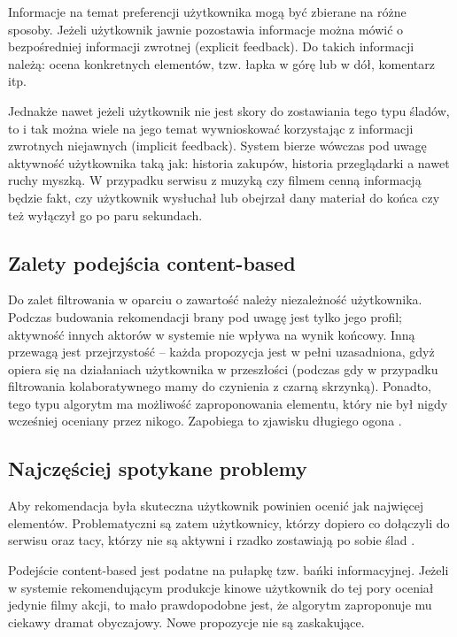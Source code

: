 \documentclass[twoside]{iisthesis}
\begin{document}
	 Informacje na temat preferencji użytkownika mogą być zbierane na różne sposoby. Jeżeli użytkownik jawnie pozostawia informacje można mówić o bezpośredniej informacji zwrotnej (explicit feedback). Do takich informacji należą: ocena konkretnych elementów, tzw. łapka w górę lub w dół, komentarz itp. 
	 
	 Jednakże nawet jeżeli użytkownik nie jest skory do zostawiania tego typu śladów, to i tak można wiele na jego temat wywnioskować korzystając z informacji zwrotnych niejawnych (implicit feedback). System bierze wówczas pod uwagę aktywność użytkownika taką jak: historia zakupów, historia przeglądarki a nawet ruchy myszką. W przypadku serwisu z muzyką czy filmem cenną informacją będzie fakt, czy użytkownik wysłuchał lub obejrzał dany materiał do końca czy też wyłączył go po paru sekundach. \cite{id:ContentBasedRecommenderSystemsState}\cite{id:AdvancesInCollaborativeFiltering}
	 
	 \subsection{Zalety podejścia content-based}
	 
	 Do zalet filtrowania w oparciu o zawartość należy niezależność użytkownika. Podczas budowania rekomendacji brany pod uwagę jest tylko jego profil; aktywność innych aktorów w systemie nie wpływa na wynik końcowy. Inną przewagą jest przejrzystość -- każda propozycja jest w pełni uzasadniona, gdyż opiera się na działaniach użytkownika w przeszłości (podczas gdy w przypadku filtrowania kolaboratywnego mamy do czynienia z czarną skrzynką). Ponadto, tego typu algorytm ma możliwość zaproponowania elementu, który nie był nigdy wcześniej oceniany przez nikogo. Zapobiega to zjawisku długiego ogona	 \cite{id:ContentBasedRecommenderSystemsState}.
	 
	 \subsection{Najczęściej spotykane problemy}
	 Aby rekomendacja była skuteczna użytkownik powinien ocenić jak najwięcej elementów. Problematyczni są zatem użytkownicy, którzy dopiero co dołączyli do serwisu oraz tacy, którzy nie są aktywni i rzadko zostawiają po sobie ślad 	 \cite{id:MaleszkaMianowskaNguyenmethod}.
	 
	 Podejście content-based jest podatne na pułapkę tzw. bańki informacyjnej. Jeżeli w systemie rekomendującym produkcje kinowe użytkownik do tej pory oceniał jedynie filmy akcji, to mało prawdopodobne jest, że algorytm zaproponuje mu ciekawy dramat obyczajowy. Nowe propozycje nie są zaskakujące\cite{id:ContentBasedRecommenderSystemsState}.
	 
\end{document}
